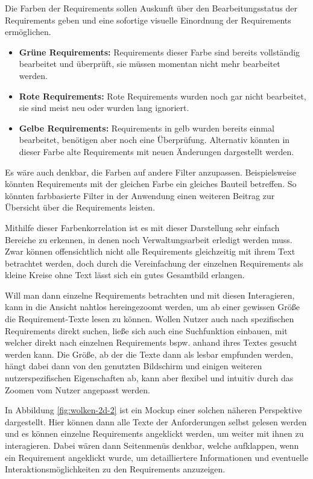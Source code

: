 Die Farben der Requirements sollen Auskunft über den Bearbeitungsstatus der Requirements geben und eine sofortige visuelle Einordnung der Requirements ermöglichen.
\begin{itemize}
    \item \textbf{Grüne Requirements:} Requirements dieser Farbe sind bereits vollständig bearbeitet und überprüft, sie müssen momentan nicht mehr bearbeitet werden.
    \item \textbf{Rote Requirements:} Rote Requirements wurden noch gar nicht bearbeitet, sie sind meist neu oder wurden lang ignoriert.
    \item \textbf{Gelbe Requirements:} Requirements in gelb wurden bereits einmal bearbeitet, benötigen aber noch eine Überprüfung. Alternativ könnten in dieser Farbe alte Requirements mit neuen Änderungen dargestellt werden.
\end{itemize}
Es wäre auch denkbar, die Farben auf andere Filter anzupassen.
Beispielsweise könnten Requirements mit der gleichen Farbe ein gleiches Bauteil betreffen.
So könnten farbbasierte Filter in der Anwendung einen weiteren Beitrag zur Übersicht über die Requirements leisten.

Mithilfe dieser Farbenkorrelation ist es mit dieser Darstellung sehr einfach Bereiche zu erkennen, in denen noch Verwaltungsarbeit erledigt werden muss.
Zwar können offensichtlich nicht alle Requirements gleichzeitig mit ihrem Text betrachtet werden, doch durch die Vereinfachung der einzelnen Requirements als kleine Kreise ohne Text lässt sich ein gutes Gesamtbild erlangen.


Will man dann einzelne Requirements betrachten und mit diesen Interagieren, kann in die Ansicht nahtlos hereingezoomt werden, um ab einer gewissen Größe die Requirement-Texte lesen zu können.
Wollen Nutzer auch nach spezifischen Requirements direkt suchen, ließe sich auch eine Suchfunktion einbauen, mit welcher direkt nach einzelnen Requirements bspw. anhand ihres Textes gesucht werden kann.
Die Größe, ab der die Texte dann als lesbar empfunden werden, hängt dabei dann von den genutzten Bildschirm und einigen weiteren nutzerspezifischen Eigenschaften ab, kann aber flexibel und intuitiv durch das Zoomen vom Nutzer angepasst werden.

In Abbildung \ref{fig:wolken-2d-2} ist ein Mockup einer solchen näheren Perspektive dargestellt.
Hier können dann alle Texte der Anforderungen selbst gelesen werden und es können einzelne Requirements angeklickt werden, um weiter mit ihnen zu interagieren.
Dabei wären dann Seitenmenüs denkbar, welche aufklappen, wenn ein Requirement angeklickt wurde, um detailliertere Informationen und eventuelle Interaktionsmöglichkeiten zu den Requirements anzuzeigen.

